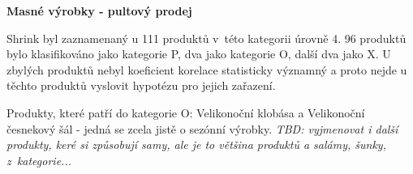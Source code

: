 


\textbf{Masné výrobky - pultový prodej}

Shrink byl zaznamenaný u 111 produktů v~této kategorii úrovně 4. 96 produktů bylo klasifikováno jako kategorie P, dva jako kategorie O, další dva jako X. U zbylých produktů nebyl koeficient korelace statisticky významný a proto nejde u těchto produktů vyslovit hypotézu pro jejich zařazení.

Produkty, které patří do kategorie O: Velikonoční klobása a Velikonoční česnekový šál - jedná se zcela jistě o sezónní výrobky. \emph{TBD: vyjmenovat i další produkty, keré si způsobují samy, ale je to většina produktů a salámy, šunky, z~kategorie...} 

